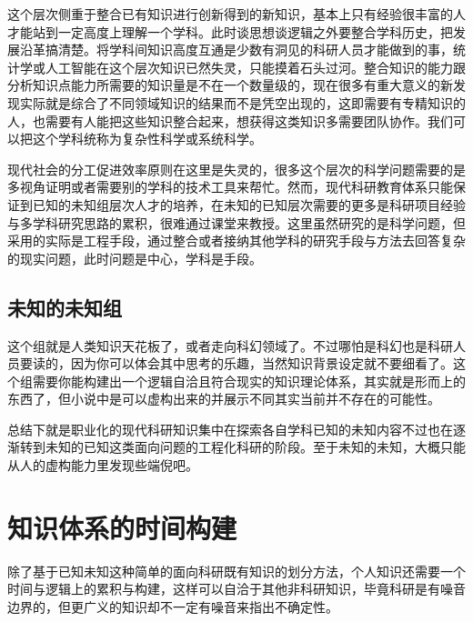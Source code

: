 \documentclass[]{tufte-book}
\begin{document}
这个层次侧重于整合已有知识进行创新得到的新知识，基本上只有经验很丰富的人才能站到一定高度上理解一个学科。此时谈思想谈逻辑之外要整合学科历史，把发展沿革搞清楚。将学科间知识高度互通是少数有洞见的科研人员才能做到的事，统计学或人工智能在这个层次知识已然失灵，只能摸着石头过河。整合知识的能力跟分析知识点能力所需要的知识量是不在一个数量级的，现在很多有重大意义的新发现实际就是综合了不同领域知识的结果而不是凭空出现的，这即需要有专精知识的人，也需要有人能把这些知识整合起来，想获得这类知识多需要团队协作。我们可以把这个学科统称为复杂性科学或系统科学。

现代社会的分工促进效率原则在这里是失灵的，很多这个层次的科学问题需要的是多视角证明或者需要别的学科的技术工具来帮忙。然而，现代科研教育体系只能保证到已知的未知组层次人才的培养，在未知的已知层次需要的更多是科研项目经验与多学科研究思路的累积，很难通过课堂来教授。这里虽然研究的是科学问题，但采用的实际是工程手段，通过整合或者接纳其他学科的研究手段与方法去回答复杂的现实问题，此时问题是中心，学科是手段。

\hypertarget{ux672aux77e5ux7684ux672aux77e5ux7ec4}{%
\subsection{未知的未知组}\label{ux672aux77e5ux7684ux672aux77e5ux7ec4}}

这个组就是人类知识天花板了，或者走向科幻领域了。不过哪怕是科幻也是科研人员要读的，因为你可以体会其中思考的乐趣，当然知识背景设定就不要细看了。这个组需要你能构建出一个逻辑自洽且符合现实的知识理论体系，其实就是形而上的东西了，但小说中是可以虚构出来的并展示不同其实当前并不存在的可能性。

总结下就是职业化的现代科研知识集中在探索各自学科已知的未知内容不过也在逐渐转到未知的已知这类面向问题的工程化科研的阶段。至于未知的未知，大概只能从人的虚构能力里发现些端倪吧。

\hypertarget{ux77e5ux8bc6ux4f53ux7cfbux7684ux65f6ux95f4ux6784ux5efa}{%
\section{知识体系的时间构建}\label{ux77e5ux8bc6ux4f53ux7cfbux7684ux65f6ux95f4ux6784ux5efa}}

除了基于已知未知这种简单的面向科研既有知识的划分方法，个人知识还需要一个时间与逻辑上的累积与构建，这样可以自洽于其他非科研知识，毕竟科研是有噪音边界的，但更广义的知识却不一定有噪音来指出不确定性。
\end{document}
